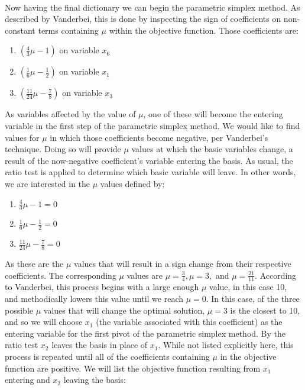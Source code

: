 \documentclass{article}
\begin{document}
\\

Now having the final dictionary we can begin the parametric simplex method. As described by Vanderbei, this is done by inspecting the sign of coefficients on non-constant terms containing $\mu$ within the objective function. Those coefficients are:

\begin{enumerate}
    \item $(\frac{4}{3}\mu -1)$ on variable $x_6$
    \item $(\frac{1}{6}\mu -\frac{1}{2})$ on variable $x_1$
    \item $(\frac{11}{24}\mu -\frac{7}{8})$ on variable $x_3$
\end{enumerate}

As variables affected by the value of $\mu$, one of these will become the entering variable in the first step of the parametric simplex method. We would like to find values for $\mu$ in which those coefficients become negative, per Vanderbei's technique. Doing so will provide $\mu$ values at which the basic variables change, a result of the now-negative coefficient's variable entering the basis. As usual, the ratio test is applied to determine which basic variable will leave. In other words, we are interested in the $\mu$ values defined by:

\begin{enumerate}
    \item $\frac{4}{3}\mu - 1 = 0$
    \item $\frac{1}{6}\mu - \frac{1}{2} = 0$
    \item $\frac{11}{24}\mu - \frac{7}{8} = 0$
\end{enumerate}

As these are the $\mu$ values that will result in a sign change from their respective coefficients. The corresponding $\mu$ values are $\mu = \frac{3}{4}, \mu = 3,$ and $\mu = \frac{21}{11}$. According to Vanderbei, this process begins with a large enough $\mu$ value, in this case 10, and methodically lowers this value until we reach $\mu = 0$. In this case, of the three possible $\mu$ values that will change the optimal solution, $\mu = 3$ is the closest to 10, and so we will choose $x_1$ (the variable associated with this coefficient) as the entering variable for the first pivot of the parametric simplex method. By the ratio test $x_2$ leaves the basis in place of $x_1$. While not listed explicitly here, this process is repeated until all of the coefficients containing $\mu$ in the objective function are positive. We will list the objective function resulting from $x_1$ entering and $x_2$ leaving the basis: 
\end{document}
